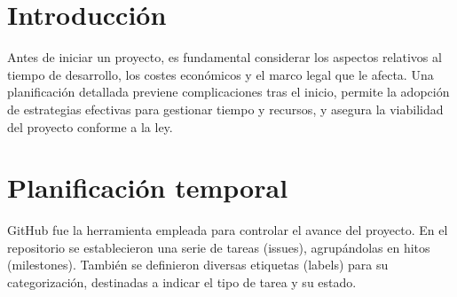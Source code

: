 
\section{Introducción}
Antes de iniciar un proyecto, es fundamental considerar los aspectos relativos al tiempo de desarrollo, los costes económicos y el marco legal que le afecta. Una planificación detallada previene complicaciones tras el inicio, permite la adopción de estrategias efectivas para gestionar tiempo y recursos, y asegura la viabilidad del proyecto conforme a la ley.

\section{Planificación temporal}
GitHub fue la herramienta empleada para controlar el avance del proyecto. En el repositorio se establecieron una serie de tareas (issues), agrupándolas en hitos (milestones). También se definieron diversas etiquetas (labels) para su categorización, destinadas a indicar el tipo de tarea y su estado.

